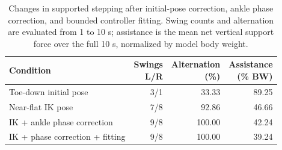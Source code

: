 \begin{table}[htbp]
\centering
\caption{Changes in supported stepping after initial-pose correction, ankle phase correction, and bounded controller fitting. Swing counts and alternation are evaluated from 1 to 10 s; assistance is the mean net vertical support force over the full 10 s, normalized by model body weight.}
\label{tab:w2l108_ground_changes}
\small
\begin{tabularx}{\textwidth}{@{}Xrrr@{}}
\toprule
Condition & \shortstack{Swings\\L/R} & \shortstack{Alternation\\(\%)} & \shortstack{Assistance\\(\% BW)} \\
\midrule
Toe-down initial pose & 3/1 & 33.33 & 89.25 \\
Near-flat IK pose & 7/8 & 92.86 & 46.66 \\
IK + ankle phase correction & 9/8 & 100.00 & 42.24 \\
IK + phase correction + fitting & 9/8 & 100.00 & 39.24 \\
\bottomrule
\end{tabularx}
\end{table}
